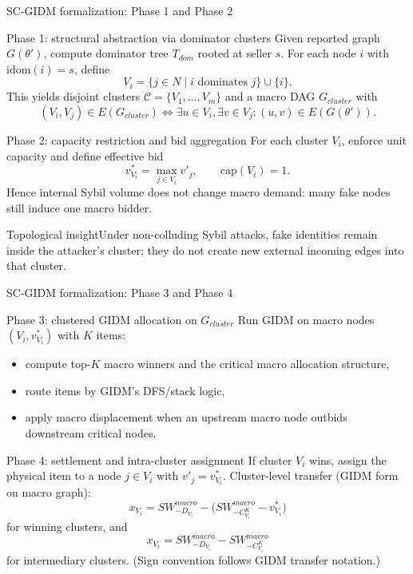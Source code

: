 \documentclass[10pt,aspectratio=169]{beamer}
\newcommand{\greenblock}[2]{\begin{exampleblock}{#1}#2\end{exampleblock}}
\newcommand{\Ccal}{\mathcal{C}}
\begin{document}
\begin{frame}{SC-GIDM formalization: Phase 1 and Phase 2}
\small
\begin{block}{Phase 1: structural abstraction via dominator clusters}
Given reported graph $G(\theta')$, compute dominator tree $T_{dom}$ rooted at seller $s$.
For each node $i$ with $\mathrm{idom}(i)=s$, define
\[
  V_i = \{j\in N\mid i\text{ dominates }j\}\cup\{i\}.
\]
This yields disjoint clusters $\Ccal=\{V_1,\dots,V_m\}$ and a macro DAG $G_{cluster}$ with
\[
  (V_i,V_j)\in E(G_{cluster})\iff \exists u\in V_i,\exists v\in V_j:(u,v)\in E(G(\theta')).
\]
\end{block}

\begin{block}{Phase 2: capacity restriction and bid aggregation}
For each cluster $V_i$, enforce unit capacity and define effective bid
\[
  v^*_{V_i}=\max_{j\in V_i} v'_j, \qquad \text{cap}(V_i)=1.
\]
Hence internal Sybil volume does not change macro demand: many fake nodes still induce one macro bidder.
\end{block}

\greenblock{Topological insight}{Under non-colluding Sybil attacks, fake identities remain inside the attacker's cluster; they do not create new external incoming edges into that cluster.}
\end{frame}

\begin{frame}{SC-GIDM formalization: Phase 3 and Phase 4}
\small
\begin{block}{Phase 3: clustered GIDM allocation on $G_{cluster}$}
Run GIDM on macro nodes $(V_i,v^*_{V_i})$ with $K$ items:
\begin{itemize}
  \item compute top-$K$ macro winners and the critical macro allocation structure,
  \item route items by GIDM's DFS/stack logic,
  \item apply macro displacement when an upstream macro node outbids downstream critical nodes.
\end{itemize}
\end{block}

\begin{block}{Phase 4: settlement and intra-cluster assignment}
{\scriptsize
If cluster $V_i$ wins, assign the physical item to a node $j\in V_i$ with $v'_j=v^*_{V_i}$.
Cluster-level transfer (GIDM form on macro graph):
\[
  x_{V_i}=SW^{macro}_{-D_{V_i}}-\big(SW^{macro}_{-C^K_{V_i}}-v^*_{V_i}\big)
\]
for winning clusters, and
\[
  x_{V_i}=SW^{macro}_{-D_{V_i}}-SW^{macro}_{-C^K_{V_i}}
\]
for intermediary clusters. (Sign convention follows GIDM transfer notation.)
}
\end{block}
\end{frame}
\end{document}
